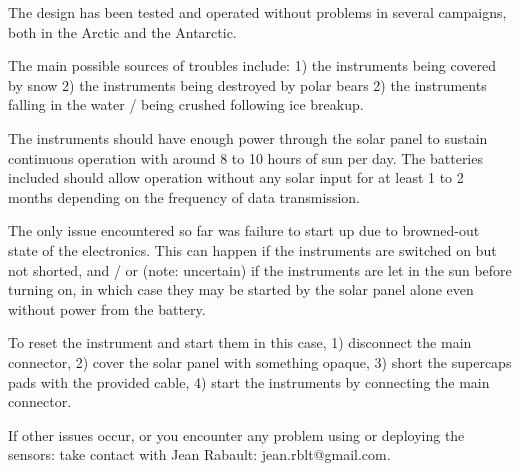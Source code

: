 \documentclass[pdftex,a4paper,12pt,twocolumn,fleqn,captions=tableheading]{scrartcl}
\begin{document}
The design has been tested and operated without problems in several campaigns, both in the Arctic and the Antarctic.

The main possible sources of troubles include: 1) the instruments being covered by snow 2) the instruments being destroyed by polar bears 2) the instruments falling in the water / being crushed following ice breakup.

The instruments should have enough power through the solar panel to sustain continuous operation with around 8 to 10 hours of sun per day. The batteries included should allow operation without any solar input for at least 1 to 2 months depending on the frequency of data transmission.

The only issue encountered so far was failure to start up due to browned-out state of the electronics. This can happen if the instruments are switched on but not shorted, and / or (note: uncertain) if the instruments are let in the sun before turning on, in which case they may be started by the solar panel alone even without power from the battery.

To reset the instrument and start them in this case, 1) disconnect the main connector, 2) cover the solar panel with something opaque, 3) short the supercaps pads with the provided cable, 4) start the instruments by connecting the main connector.

If other issues occur, or you encounter any problem using or deploying the sensors: take contact with Jean Rabault: jean.rblt@gmail.com.
\end{document}
